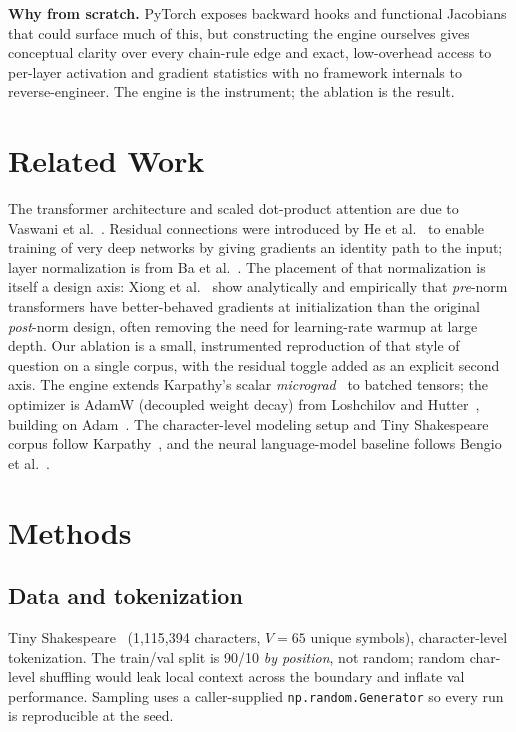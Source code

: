 \documentclass{article}
\begin{document}
\textbf{Why from scratch.} PyTorch exposes backward hooks and functional Jacobians that could surface much of this, but constructing the engine ourselves gives conceptual clarity over every chain-rule edge and exact, low-overhead access to per-layer activation and gradient statistics with no framework internals to reverse-engineer. The engine is the instrument; the ablation is the result.

\section{Related Work}
The transformer architecture and scaled dot-product attention are due to Vaswani et al.~\cite{vaswani2017attention}. Residual connections were introduced by He et al.~\cite{he2016resnet} to enable training of very deep networks by giving gradients an identity path to the input; layer normalization is from Ba et al.~\cite{ba2016layernorm}. The placement of that normalization is itself a design axis: Xiong et al.~\cite{xiong2020prenorm} show analytically and empirically that \emph{pre}-norm transformers have better-behaved gradients at initialization than the original \emph{post}-norm design, often removing the need for learning-rate warmup at large depth. Our ablation is a small, instrumented reproduction of that style of question on a single corpus, with the residual toggle added as an explicit second axis. The engine extends Karpathy's scalar \textit{micrograd}~\cite{karpathy2020micrograd} to batched tensors; the optimizer is AdamW (decoupled weight decay) from Loshchilov and Hutter~\cite{loshchilov2019adamw}, building on Adam~\cite{kingma2015adam}. The character-level modeling setup and Tiny Shakespeare corpus follow Karpathy~\cite{karpathy2015charrnn}, and the neural language-model baseline follows Bengio et al.~\cite{bengio2003neural}.

\section{Methods}

\subsection{Data and tokenization} Tiny Shakespeare~\cite{karpathy2015charrnn} (1{,}115{,}394 characters, $V=65$ unique symbols), character-level tokenization. The train/val split is 90/10 \emph{by position}, not random; random char-level shuffling would leak local context across the boundary and inflate val performance. Sampling uses a caller-supplied \texttt{np.random.Generator} so every run is reproducible at the seed.
\end{document}
